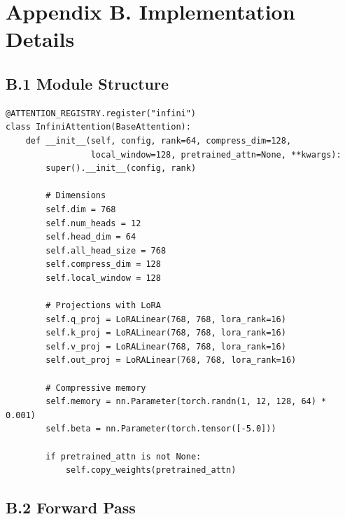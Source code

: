 
\section{Appendix B. Implementation Details}

\subsection{B.1 Module Structure}

\begin{lstlisting}
@ATTENTION_REGISTRY.register("infini")
class InfiniAttention(BaseAttention):
    def __init__(self, config, rank=64, compress_dim=128,
                 local_window=128, pretrained_attn=None, **kwargs):
        super().__init__(config, rank)
        
        # Dimensions
        self.dim = 768
        self.num_heads = 12
        self.head_dim = 64
        self.all_head_size = 768
        self.compress_dim = 128
        self.local_window = 128
        
        # Projections with LoRA
        self.q_proj = LoRALinear(768, 768, lora_rank=16)
        self.k_proj = LoRALinear(768, 768, lora_rank=16)
        self.v_proj = LoRALinear(768, 768, lora_rank=16)
        self.out_proj = LoRALinear(768, 768, lora_rank=16)
        
        # Compressive memory
        self.memory = nn.Parameter(torch.randn(1, 12, 128, 64) * 0.001)
        self.beta = nn.Parameter(torch.tensor([-5.0]))
        
        if pretrained_attn is not None:
            self.copy_weights(pretrained_attn)
\end{lstlisting}

\subsection{B.2 Forward Pass}

